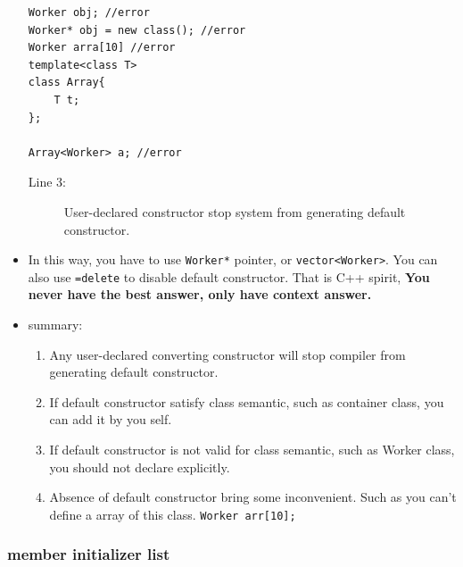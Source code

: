 \documentclass[a4paper,11pt,twoside]{book}
\begin{document}
\begin{itemize}
\begin{lstlisting}
Worker obj; //error
Worker* obj = new class(); //error
Worker arra[10] //error
template<class T>
class Array{
	T t;
};

Array<Worker> a; //error
\end{lstlisting}
\begin{description}
	\item[Line 3:] User-declared constructor stop system from generating default constructor.
\end{description}

	
\item In this way, you have to use \texttt{Worker*} pointer, or \texttt{vector<Worker>}.  You can also use \texttt{=delete} to disable default constructor. That is C++ spirit, \textbf{You never have the best answer, only have context answer. }

\item summary:
\begin{enumerate}
	\item Any user-declared converting constructor will stop compiler from generating default constructor.

	\item If default constructor satisfy class semantic, such as container class, you can add it by you self.

	\item If default constructor is not valid for class semantic, such as Worker class, you should not declare explicitly. 

	\item Absence of default constructor bring some inconvenient. Such as you can't define a array of this class. \texttt{Worker arr[10];} 
\end{enumerate}
	
\end{itemize}

\subsubsection{member initializer list}
\end{document}
